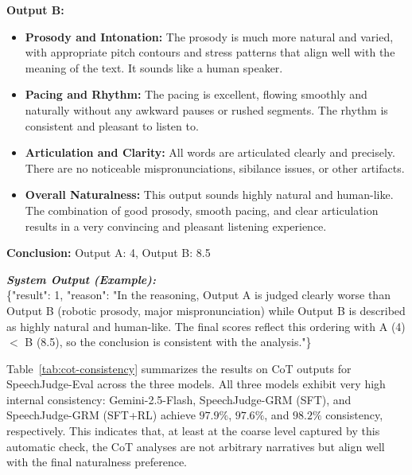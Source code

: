 \documentclass[]{bytedance_seed}
\begin{document}
\begin{promptbox}
\textbf{Output B:}
\begin{itemize}[itemsep=0ex,leftmargin=3ex]
    \item \textbf{Prosody and Intonation:} The prosody is much more natural and varied, with appropriate pitch contours and stress patterns that align well with the meaning of the text. It sounds like a human speaker.
    \item \textbf{Pacing and Rhythm:} The pacing is excellent, flowing smoothly and naturally without any awkward pauses or rushed segments. The rhythm is consistent and pleasant to listen to.
    \item \textbf{Articulation and Clarity:} All words are articulated clearly and precisely. There are no noticeable mispronunciations, sibilance issues, or other artifacts.
    \item \textbf{Overall Naturalness:} This output sounds highly natural and human-like. The combination of good prosody, smooth pacing, and clear articulation results in a very convincing and pleasant listening experience.
\end{itemize}

\textbf{Conclusion:} Output A: 4, Output B: 8.5

\medskip \textit{\textbf{System Output (Example):} }\\
\{"result": 1, "reason": "In the reasoning, Output A is judged clearly worse than Output B (robotic prosody, major mispronunciation) while Output B is described as highly natural and human-like. The final scores reflect this ordering with A (4) $<$ B (8.5), so the conclusion is consistent with the analysis."\}

\end{promptbox}

Table~\ref{tab:cot-consistency} summarizes the results on
CoT outputs for SpeechJudge-Eval across the three models.
All three models exhibit very high internal consistency:
Gemini-2.5-Flash, SpeechJudge-GRM (SFT), and SpeechJudge-GRM (SFT+RL) achieve
$97.9\%$, $97.6\%$, and $98.2\%$ consistency, respectively.
This indicates that, at least at the coarse level captured by this automatic
check, the CoT analyses are not arbitrary narratives but align well with the
final naturalness preference.
\end{document}
